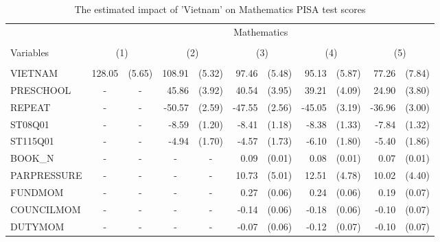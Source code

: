 \documentclass[10pt]{article}
\begin{document}
	\begin{table}[htbp]
		\footnotesize
		\def\arraystretch{1}
		\def\tabcolsep{4}
		\centering
		\caption{The estimated impact of 'Vietnam' on Mathematics PISA test scores}
     \begin{tabular}{lrlrlrlrlrl}
     	\toprule
     	\midrule
     	& \multicolumn{10}{c}{Mathematics} \\
		\cline{2-11} \\
     	Variables & \multicolumn{2}{c}{(1)} & \multicolumn{2}{c}{(2)} & \multicolumn{2}{c}{(3)} & \multicolumn{2}{c}{(4)} & \multicolumn{2}{c}{(5)} \\
     	\hline
     	&       &       &       &       &       &       &       &       &       &  \\
     	VIETNAM & 128.05 & (5.65) & 108.91 & (5.32) & 97.46 & (5.48) & 95.13 & (5.87) & 77.26 & (7.84) \\[0.2em]
     	PRESCHOOL & \multicolumn{1}{c}{-} & \multicolumn{1}{c}{-} & 45.86 & (3.92) & 40.54 & (3.95) & 39.21 & (4.09) & 24.90 & (3.80) \\[0.2em]
     	REPEAT & \multicolumn{1}{c}{-} & \multicolumn{1}{c}{-} & -50.57 & (2.59) & -47.55 & (2.56) & -45.05 & (3.19) & -36.96 & (3.00) \\[0.2em]
     	ST08Q01 & \multicolumn{1}{c}{-} & \multicolumn{1}{c}{-} & -8.59 & (1.20) & -8.41 & (1.18) & -8.38 & (1.33) & -7.84 & (1.32) \\[0.2em]
     	ST115Q01 & \multicolumn{1}{c}{-} & \multicolumn{1}{c}{-} & -4.94 & (1.70) & -4.57 & (1.73) & -6.10 & (1.80) & -5.40 & (1.86) \\[0.2em]
     	BOOK\_N & \multicolumn{1}{c}{-} & \multicolumn{1}{c}{-} & \multicolumn{1}{c}{-} & \multicolumn{1}{c}{-} & 0.09  & (0.01) & 0.08  & (0.01) & 0.07  & (0.01) \\[0.2em]
     	PARPRESSURE & \multicolumn{1}{c}{-} & \multicolumn{1}{c}{-} & \multicolumn{1}{c}{-} & \multicolumn{1}{c}{-} & 10.73 & (5.01) & 12.51 & (4.78) & 10.02 & (4.40) \\[0.2em]
     	FUNDMOM & \multicolumn{1}{c}{-} & \multicolumn{1}{c}{-} & \multicolumn{1}{c}{-} & \multicolumn{1}{c}{-} & 0.27  & (0.06) & 0.24  & (0.06) & 0.19  & (0.07) \\[0.2em]
     	COUNCILMOM & \multicolumn{1}{c}{-} & \multicolumn{1}{c}{-} & \multicolumn{1}{c}{-} & \multicolumn{1}{c}{-} & -0.14 & (0.06) & -0.18 & (0.06) & -0.10 & (0.07) \\[0.2em]
     	DUTYMOM & \multicolumn{1}{c}{-} & \multicolumn{1}{c}{-} & \multicolumn{1}{c}{-} & \multicolumn{1}{c}{-} & -0.07 & (0.06) & -0.12 & (0.07) & -0.10 & (0.07) \\[0.2em]

\end{tabular}
\end{table}
\end{document}
